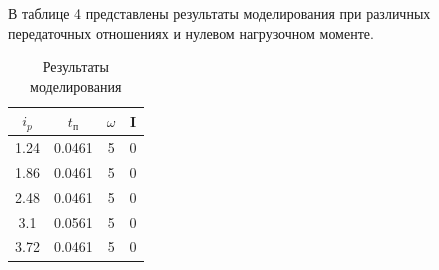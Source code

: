 \documentclass[a4paper, 11pt]{article}
\begin{document}
\par
В таблице 4 представлены результаты моделирования при различных передаточных отношениях и нулевом нагрузочном моменте.
\newpage
\begin{table}[h!]
\centering
	\begin{threeparttable}
	\caption{Результаты моделирования}\label{tab:perflogcross}
		\begin{tabular}{|c|c|c|c|}
			\hline
			$i_p$ & $t_\text{п}$ & $\omega$ & I\\
			\hline
			1.24 & 0.0461 & 5 & 0\\
			\hline
			1.86 & 0.0461 & 5 & 0\\
			\hline
			2.48 & 0.0461 & 5 & 0\\
			\hline
			3.1 & 0.0561 & 5 & 0\\
			\hline
			3.72 & 0.0461 & 5 & 0\\
			\hline
		\end{tabular}
	\end{threeparttable}
\end{table}
\end{document}
